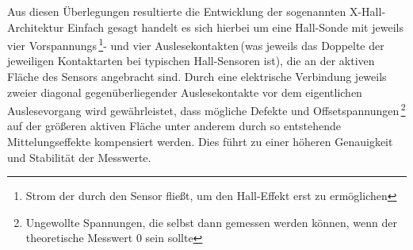 \documentclass[12pt, a4paper]{article}
\begin{document}
Aus diesen Überlegungen resultierte die Entwicklung der sogenannten X-Hall-Architektur\newline
Einfach gesagt handelt es sich hierbei um eine Hall-Sonde mit jeweils vier Vorspannungs\,\footnote{Strom der durch den Sensor fließt, um den Hall-Effekt erst zu ermöglichen}- und vier Auslesekontakten\,(was jeweils das Doppelte der jeweiligen Kontaktarten bei typischen Hall-Sensoren ist), die an der aktiven Fläche des Sensors angebracht sind. Durch eine elektrische Verbindung jeweils zweier diagonal gegenüberliegender Auslesekontakte vor dem eigentlichen Auslesevorgang wird gewährleistet, dass mögliche Defekte und Offsetspannungen\,\footnote{Ungewollte Spannungen, die selbst dann gemessen werden können, wenn der theoretische Messwert 0 sein sollte} auf der größeren aktiven Fläche unter anderem durch so entstehende Mittelungseffekte kompensiert werden. Dies führt zu einer höheren Genauigkeit und Stabilität der Messwerte.
\end{document}

